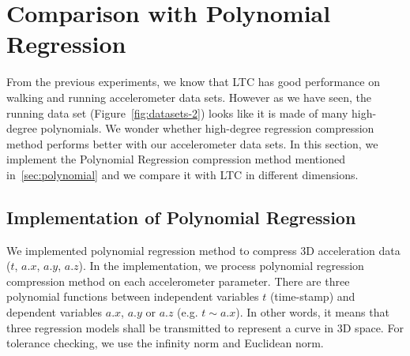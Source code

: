 \section{Comparison with Polynomial Regression}

From the previous experiments, we know that LTC has good performance on  walking
and running accelerometer data sets. However as we have seen, the running data
set (Figure~\ref{fig:datasets-2}) looks like it is made of many high-degree
polynomials. We wonder whether high-degree regression compression method
performs better with our accelerometer data sets. In this section, we
implement the Polynomial Regression compression method mentioned
in~\ref{sec:polynomial} and we compare it with LTC in different dimensions.


\subsection{Implementation of Polynomial Regression}

We implemented polynomial regression method to compress 3D acceleration data
($t$, $a.x$, $a.y$, $a.z$). In the implementation, we process polynomial
regression compression method on each accelerometer parameter. There are three
polynomial functions between independent variables $t$ (time-stamp) and
dependent variables $a.x$, $a.y$ or $a.z$ (e.g. $t \sim a.x$). In other words,
it means that three regression models shall be transmitted to represent a curve
in 3D space. For tolerance checking, we use the infinity norm and Euclidean
norm.

